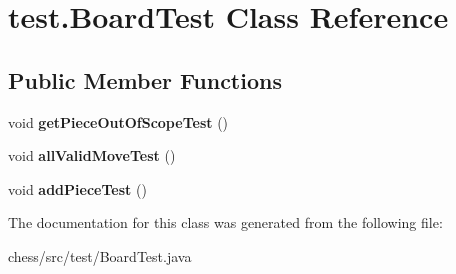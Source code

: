 \hypertarget{classtest_1_1_board_test}{}\section{test.\+Board\+Test Class Reference}
\label{classtest_1_1_board_test}
\subsection*{Public Member Functions}
\begin{DoxyCompactItemize}
\item 
\mbox{\label{classtest_1_1_board_test_ab713cae6bb09d91ed9eef459275084b3}} 
void {\bfseries get\+Piece\+Out\+Of\+Scope\+Test} ()
\item 
\mbox{\label{classtest_1_1_board_test_a2f5e3000df9a3c749f5c2a6ccf91aef1}} 
void {\bfseries all\+Valid\+Move\+Test} ()
\item 
\mbox{\label{classtest_1_1_board_test_a5e09a7eb1d095cda649b02fd8a05ff59}} 
void {\bfseries add\+Piece\+Test} ()
\end{DoxyCompactItemize}


The documentation for this class was generated from the following file\+:\begin{DoxyCompactItemize}
\item 
chess/src/test/Board\+Test.\+java\end{DoxyCompactItemize}
